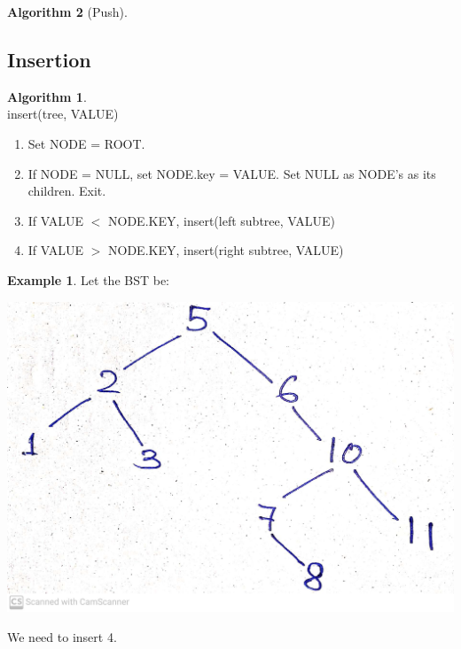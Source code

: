 \documentclass[10pt, a4paper]{extarticle}
\theoremstyle{definition}
\newtheorem{alg}{Algorithm}
\newtheorem{eg}{Example}
\begin{document}
\begin{alg}[Push]
	\subsection{Insertion}
	\begin{alg}\hfill\\
		insert(tree, VALUE)
		\begin{enumerate}
			\item Set NODE = ROOT.
			\item If NODE = NULL, set NODE.key = VALUE. Set NULL as NODE's as its children. Exit.
			\item If VALUE $<$ NODE.KEY, insert(left subtree, VALUE)
			\item If VALUE $>$ NODE.KEY, insert(right subtree, VALUE)
	\end{enumerate}
	\end{alg}
	\begin{eg}
		Let the BST be:
		\begin{center}
			\includegraphics[scale=0.07]{bst1.jpg}\\
		\end{center}
		We need to insert 4.
		\begin{center}

\end{center}
\end{eg}
\end{alg}
\end{document}
